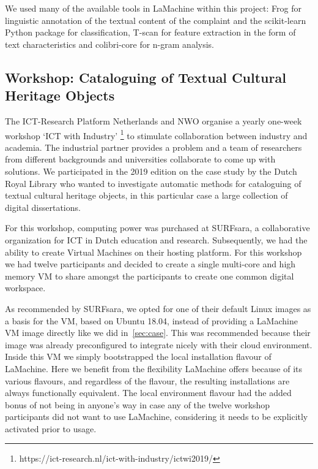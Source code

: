 \documentclass[a4paper,11pt]{article}
\begin{document}
We used many of the available tools in LaMachine within this project: Frog for linguistic annotation of the textual
content of the complaint and the scikit-learn Python package for classification, T-scan for feature extraction in the form of text characteristics and colibri-core for n-gram analysis.


\subsection{Workshop: Cataloguing of Textual Cultural Heritage Objects}
\label{sec:case2}

The ICT-Research Platform Netherlands and NWO organise a yearly one-week workshop `ICT with Industry'
\footnote{https://ict-research.nl/ict-with-industry/ictwi2019/} to stimulate collaboration between industry and
academia. The industrial partner provides a problem and a team of researchers from different backgrounds and
universities collaborate to come up with solutions. We participated in the 2019 edition on the case study by the Dutch Royal Library who wanted to investigate automatic methods for cataloguing of textual cultural heritage objects, in this particular case a large collection of digital dissertations.

For this workshop, computing power was purchased at SURFsara, a collaborative organization for ICT in Dutch education
and research. Subsequently, we had the ability to create Virtual Machines on their hosting platform. For this workshop
we had twelve participants and decided to create a single multi-core and high memory VM to share amongst the
participants to create one common digital workspace.

As recommended by SURFsara, we opted for one of their default Linux images as a basis for the VM, based on Ubuntu 18.04,
instead of providing a LaMachine VM image directly like we did in~\ref{sec:case}. This was recommended because their image
was already preconfigured to integrate nicely with their cloud environment. Inside this VM we simply bootstrapped the local
installation flavour of LaMachine.  Here we benefit from the flexibility LaMachine offers because of its various
flavours, and regardless of the flavour, the resulting installations are always functionally equivalent. The local
environment flavour had the added bonus of not being in anyone's way in case any of the twelve workshop participants did
not want to use LaMachine, considering it needs to be explicitly activated prior to usage.
\end{document}
